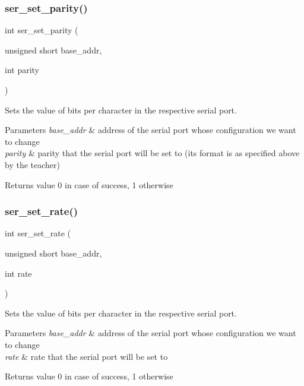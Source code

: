 \subsubsection{\texorpdfstring{ser\+\_\+set\+\_\+parity()}{ser\_set\_parity()}}
{\footnotesize\ttfamily int ser\+\_\+set\+\_\+parity (\begin{DoxyParamCaption}\item[{unsigned short}]{base\+\_\+addr,  }\item[{int}]{parity }\end{DoxyParamCaption})}



Sets the value of bits per character in the respective serial port. 


\begin{DoxyParams}{Parameters}
{\em base\+\_\+addr} & address of the serial port whose configuration we want to change\\
\hline
{\em parity} & parity that the serial port will be set to (its format is as specified above by the teacher)\\
\hline
\end{DoxyParams}
\begin{DoxyReturn}{Returns}
value 0 in case of success, 1 otherwise 
\end{DoxyReturn}
\hypertarget{group__ser__port_ga2b6153e7105a706ea7a331770150ac55}{}\label{group__ser__port_ga2b6153e7105a706ea7a331770150ac55} 
\subsubsection{\texorpdfstring{ser\+\_\+set\+\_\+rate()}{ser\_set\_rate()}}
{\footnotesize\ttfamily int ser\+\_\+set\+\_\+rate (\begin{DoxyParamCaption}\item[{unsigned short}]{base\+\_\+addr,  }\item[{int}]{rate }\end{DoxyParamCaption})}



Sets the value of bits per character in the respective serial port. 


\begin{DoxyParams}{Parameters}
{\em base\+\_\+addr} & address of the serial port whose configuration we want to change\\
\hline
{\em rate} & rate that the serial port will be set to\\
\hline
\end{DoxyParams}
\begin{DoxyReturn}{Returns}
value 0 in case of success, 1 otherwise 
\end{DoxyReturn}
\hypertarget{group__ser__port_ga7d67a8d80697182bb1afe90a65875c90}{}\label{group__ser__port_ga7d67a8d80697182bb1afe90a65875c90} 
